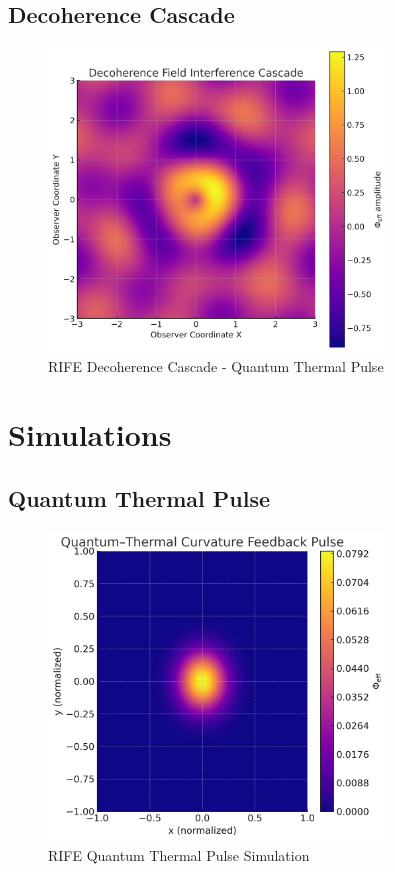 \documentclass[11pt]{report}
\begin{document}
\subsection{Decoherence Cascade}
\begin{figure}[ht]
  \centering
  \includegraphics[width=0.8\textwidth]{recursive_engines/decoherence_cascade.png}
  \caption{RIFE Decoherence Cascade - Quantum Thermal Pulse}
\end{figure}

\section{Simulations}

\subsection{Quantum Thermal Pulse}
\begin{figure}[ht]
  \centering
  \includegraphics[width=0.8\textwidth]{simulations/quantum_thermal.png}
  \caption{RIFE Quantum Thermal Pulse Simulation}
\end{figure}
\end{document}
